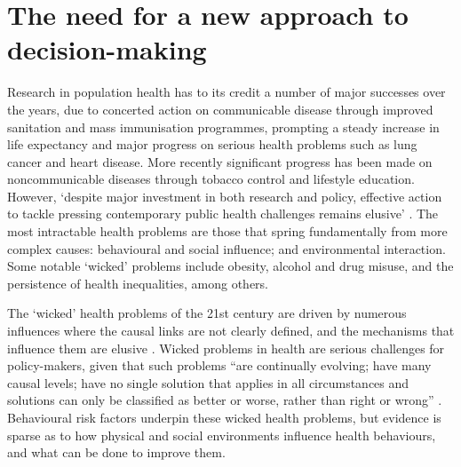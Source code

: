 \documentclass[review]{elsarticle}
\begin{document}


\section{The need for a new approach to decision-making}


Research in population health has to its credit a number of major successes over the years, due to concerted action on communicable disease through improved sanitation and mass immunisation programmes, prompting a steady increase in life expectancy and major progress on serious health problems such as lung cancer and heart disease.  More recently significant progress has been made on noncommunicable diseases through tobacco control and lifestyle education.  However, `despite major investment in both research and policy, effective action to tackle pressing contemporary public health challenges remains elusive' \citep{rutter2017}. The most intractable health problems are those that spring fundamentally from more complex causes: behavioural and social influence; and environmental interaction.  Some notable `wicked' problems include obesity, alcohol and drug misuse, and the persistence of health inequalities, among others.

The `wicked' health problems of the 21st century are driven by numerous influences where the causal links are not clearly defined, and the mechanisms that influence them are elusive \citep{rittel1973}. Wicked problems in health are serious challenges for policy-makers, given that such problems ``are continually evolving; have many causal levels; have no single solution that applies in all circumstances and solutions can only be classified as better or worse, rather than right or wrong'' \citep{signal2013}.  Behavioural risk factors underpin these wicked health problems, but evidence is sparse as to how physical and social environments influence health behaviours, and what can be done to improve them. 
\end{document}
